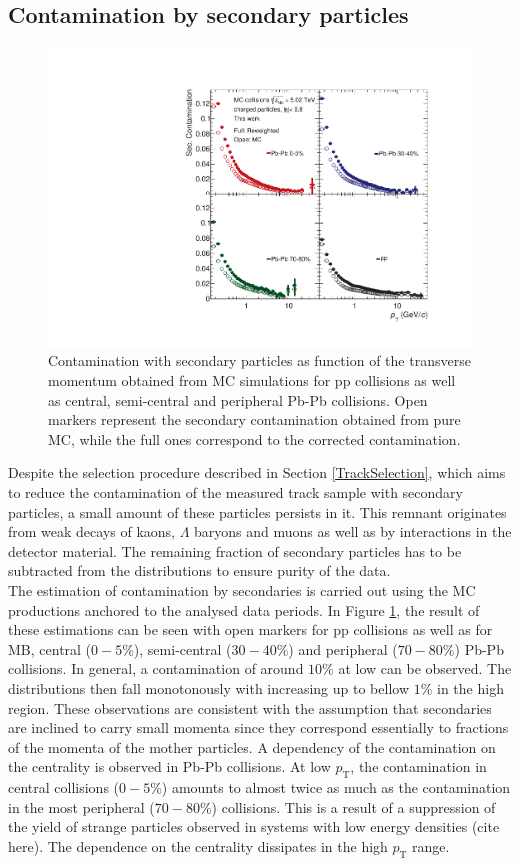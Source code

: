 \documentclass[12pt,a4paper]{report}
\begin{document}
\subsection{Contamination by secondary particles}
\begin{figure}[tb!]
\centering
\includegraphics[width=12cm]{Plots/secCont.pdf}  
\caption{Contamination with secondary particles as function of the transverse momentum obtained from MC simulations for pp collisions as well as central, semi-central and peripheral Pb-Pb collisions. Open markers represent the secondary contamination obtained from pure MC, while the full ones correspond to the  corrected contamination.}
\label{SecCont}
\end{figure}
Despite the selection procedure described in Section \ref{TrackSelection}, which aims to reduce the contamination of the measured track sample with secondary particles, a small amount of these particles persists in it. This remnant originates from weak decays of kaons, $\Lambda$ baryons and muons as well as by interactions in the detector material. The remaining fraction of secondary particles has to be subtracted from the \pt distributions to ensure purity of the data.\\
The estimation of contamination by secondaries is carried out using the MC productions anchored to the analysed data periods. In Figure \ref{SecCont}, the result of these estimations can be seen with open markers for pp collisions as well as for MB, central ($0-5$\%), semi-central ($30-40$\%) and peripheral ($70-80$\%) Pb-Pb collisions. In general, a contamination of around  $10\%$ at low \pt can be observed. The distributions then fall monotonously with increasing \pt up to bellow $1\%$ in the high \pt region. These observations are consistent with the assumption that secondaries are inclined to carry small momenta since they correspond essentially to fractions of the momenta of the mother particles. A dependency of the contamination on the centrality is observed in Pb-Pb collisions. At low $p_\text{T}$, the contamination in central collisions ($0-5$\%) amounts to almost twice as much as the contamination in the most peripheral ($70-80$\%) collisions. This is a result of a suppression of the yield of strange particles observed in systems with low energy densities (cite here). The dependence on the centrality dissipates in the high $p_\text{T}$ range.
\end{document}
